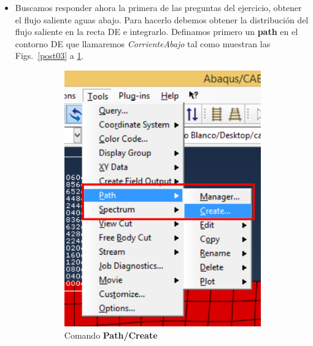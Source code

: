 \begin{itemize}
\item Buscamos responder ahora la primera de las preguntas del
  ejercicio, obtener el flujo saliente aguas abajo. Para hacerlo
  debemos obtener la distribución del flujo saliente en la recta DE e
  integrarlo. Definamos primero un \textbf{path} en el contorno DE que
  llamaremos \textit{CorrienteAbajo} tal como muestran las
  Figs.~\ref{post03} a \ref{post05}.

  \begin{figure}[!h]
    \centering
    \begin{subfigure}[!h]{0.20\textwidth}
      \includegraphics[width=\textwidth]{./body/images/post05.pdf}
      \caption{Comando \textbf{Path/Create}}
      \label{post05}
    \end{subfigure}%
    \begin{subfigure}[!h]{0.40\textwidth}

\end{subfigure}
\end{figure}
\end{itemize}
